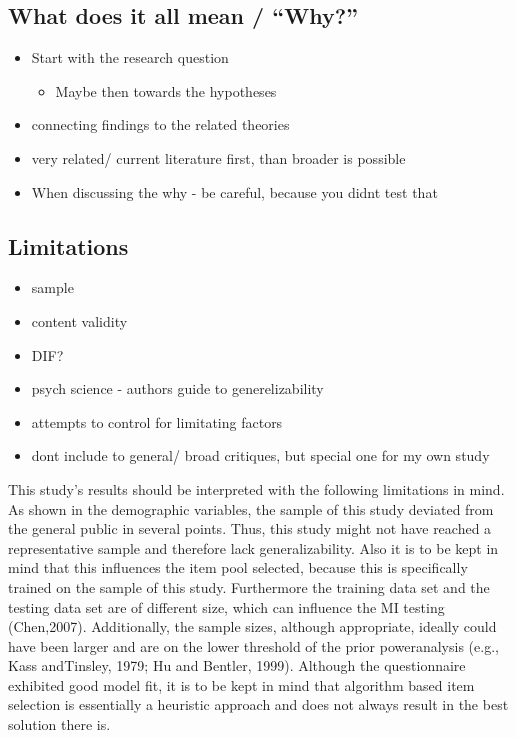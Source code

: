\documentclass[
  12pt,
  a4paper,
  twoside]{article}
\providecommand{\tightlist}{%
  \setlength{\itemsep}{0pt}\setlength{\parskip}{0pt}}
\begin{document}
\subsection{What does it all mean / ``Why?''}\label{what-does-it-all-mean-why}

\begin{itemize}
\tightlist
\item
  Start with the research question

  \begin{itemize}
  \tightlist
  \item
    Maybe then towards the hypotheses
  \end{itemize}
\item
  connecting findings to the related theories
\item
  very related/ current literature first, than broader is possible
\item
  When discussing the why - be careful, because you didnt test that
\end{itemize}

\subsection{Limitations}\label{limitations}

\begin{itemize}
\tightlist
\item
  sample
\item
  content validity
\item
  DIF?
\item
  psych science - authors guide to generelizability
\item
  attempts to control for limitating factors
\item
  dont include to general/ broad critiques, but special one for my own study
\end{itemize}

This study's results should be interpreted with the following limitations in mind.
As shown in the demographic variables, the sample of this study deviated from the
general public in several points. Thus, this study might not have reached a representative sample
and therefore lack generalizability. Also it is to be kept in mind that this influences the
item pool selected, because this is specifically trained on the sample of this study.
Furthermore the training data set and the testing data set are of different size, which
can influence the MI testing (Chen,2007). Additionally, the sample sizes, although appropriate, ideally could have been larger and are on the lower threshold of the prior poweranalysis (e.g., Kass andTinsley, 1979; Hu and Bentler, 1999).
Although the questionnaire exhibited good model fit, it is to be kept in mind
that algorithm based item selection is essentially a heuristic approach and does not
always result in the best solution there is.
\end{document}
